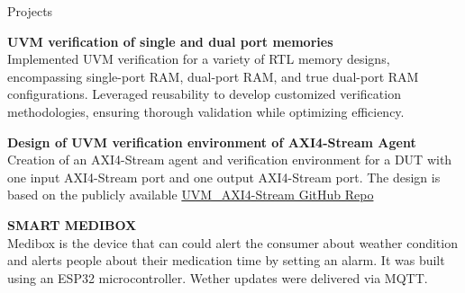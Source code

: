 \documentclass[
	11pt, %
]{./assets/resume} %
\begin{document}
\begin{rSection}{Projects}

	\textbf{UVM verification of single and dual port memories} \\
	Implemented UVM verification for a variety of RTL memory designs, encompassing single-port RAM, dual-port RAM, and true dual-port RAM configurations. Leveraged reusability to develop customized verification methodologies, ensuring thorough validation while optimizing efficiency.

	\textbf{Design of UVM verification environment of AXI4-Stream Agent} \\ 
	Creation of an AXI4-Stream agent and verification environment for a DUT with one input AXI4-Stream port and one output AXI4-Stream port. The design is based on the publicly available \href{https://github.com/makararasi/UVM_AXI4-Stream}{UVM\_AXI4-Stream GitHub Repo}

	\textbf{SMART MEDIBOX} \\
	Medibox is the device that can could alert the consumer about weather condition and alerts people about their medication time by setting an alarm. It was built using an ESP32 microcontroller. Wether updates were delivered via MQTT.

\end{rSection}







\end{document}
